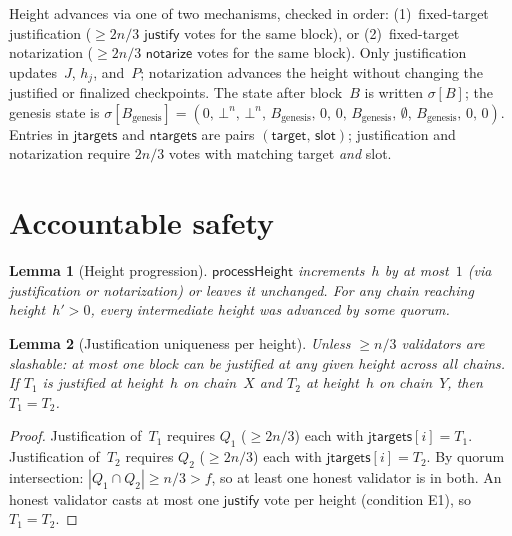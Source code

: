 \documentclass{article}
\newcommand{\target}{\mathsf{target}}
\newcommand{\justify}{\mathsf{justify}}
\newcommand{\notarize}{\mathsf{notarize}}
\theoremstyle{plain}
\newtheorem{lemma}{Lemma}
\theoremstyle{definition}
\theoremstyle{remark}
\begin{document}
\begin{figure}[H]
\begin{center}
\begin{boxedminipage}{\textwidth}
\begin{algorithmic}[1]
\end{algorithmic}
\end{boxedminipage}
\end{center}
\end{figure}

Height advances via one of two mechanisms, checked in order: (1)~fixed-target justification ($\geq 2n/3$ $\justify$ votes for the same block), or (2)~fixed-target notarization ($\geq 2n/3$ $\notarize$ votes for the same block).
Only justification updates~$J$, $h_j$, and~$P$; notarization advances the height without changing the justified or finalized checkpoints.
The state after block~$B$ is written $\sigma[B]$; the genesis state is $\sigma[B_{\mathrm{genesis}}] = (0,\, \bot^n,\, \bot^n,\, B_{\mathrm{genesis}},\, 0,\, 0,\, B_{\mathrm{genesis}},\, \emptyset,\, B_{\mathrm{genesis}},\, 0,\, 0)$.
Entries in $\mathsf{jtargets}$ and $\mathsf{ntargets}$ are pairs $(\target,\, \mathsf{slot})$; justification and notarization require $2n/3$ votes with matching target \emph{and} slot.

\section{Accountable safety}

\begin{lemma}[Height progression]\label{lem:heightprog}
$\textsf{processHeight}$ increments~$h$ by at most~$1$ (via justification or notarization) or leaves it unchanged.
For any chain reaching height~$h' > 0$, every intermediate height was advanced by some quorum.
\end{lemma}

\begin{lemma}[Justification uniqueness per height]\label{lem:uniqueness}
Unless $\geq n/3$ validators are slashable: at most one block can be justified at any given height across all chains.
If $T_1$ is justified at height~$h$ on chain~$X$ and $T_2$ at height~$h$ on chain~$Y$, then $T_1 = T_2$.
\end{lemma}

\begin{proof}
Justification of~$T_1$ requires $Q_1$ ($\geq 2n/3$) each with $\mathsf{jtargets}[i] = T_1$.
Justification of~$T_2$ requires $Q_2$ ($\geq 2n/3$) each with $\mathsf{jtargets}[i] = T_2$.
By quorum intersection: $|Q_1 \cap Q_2| \geq n/3 > f$, so at least one honest validator is in both.
An honest validator casts at most one $\justify$ vote per height (condition E1), so $T_1 = T_2$.
\end{proof}
\end{document}
